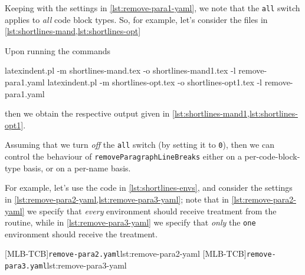 
	Keeping with the settings in \cref{lst:remove-para1-yaml}, we note that the
	\texttt{all} switch applies to \emph{all} code block
	types. So, for example, let's consider the files in \cref{lst:shortlines-mand,lst:shortlines-opt}

	\begin{cmhtcbraster}
	\end{cmhtcbraster}

	Upon running the commands
	\begin{widepage}
		\begin{commandshell}
latexindent.pl -m shortlines-mand.tex -o shortlines-mand1.tex -l remove-para1.yaml
latexindent.pl -m shortlines-opt.tex -o shortlines-opt1.tex -l remove-para1.yaml
\end{commandshell}
	\end{widepage}

	then we obtain the respective output given in \cref{lst:shortlines-mand1,lst:shortlines-opt1}.


	Assuming that we turn \emph{off} the \texttt{all} switch
	(by setting it to \texttt{0}), then we can control the behaviour of
	\texttt{removeParagraphLineBreaks} either on a per-code-block-type basis, or on a per-name
	basis.

	For example, let's use the code in \cref{lst:shortlines-envs}, and consider the settings
	in \cref{lst:remove-para2-yaml,lst:remove-para3-yaml}; note that in \cref{lst:remove-para2-yaml} we specify that
	\emph{every} environment should receive treatment from the routine, while
	in \cref{lst:remove-para3-yaml} we specify that \emph{only} the
	\texttt{one} environment should receive the treatment.

	\begin{minipage}{.45\linewidth}
	\end{minipage}
	\hfill
	\begin{minipage}{.49\linewidth}
		[MLB-TCB]{\texttt{remove-para2.yaml}}{lst:remove-para2-yaml}
		[MLB-TCB]{\texttt{remove-para3.yaml}}{lst:remove-para3-yaml}
	\end{minipage}

